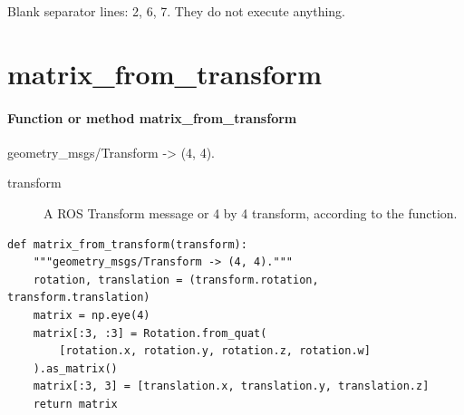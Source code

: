 \documentclass[11pt,a4paper]{book}
\begin{document}
Blank separator lines: 2, 6, 7. They do not execute anything.

\section{matrix\_from\_transform}

\paragraph{Function or method matrix\_from\_transform}
geometry\_msgs/Transform -> (4, 4).

\begin{description}
\item[transform] A ROS Transform message or 4 by 4 transform, according to the function.
\end{description}

\begin{lstlisting}[firstnumber=8]
def matrix_from_transform(transform):
    """geometry_msgs/Transform -> (4, 4)."""
    rotation, translation = (transform.rotation, transform.translation)
    matrix = np.eye(4)
    matrix[:3, :3] = Rotation.from_quat(
        [rotation.x, rotation.y, rotation.z, rotation.w]
    ).as_matrix()
    matrix[:3, 3] = [translation.x, translation.y, translation.z]
    return matrix


\end{lstlisting}
\end{document}
